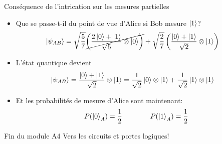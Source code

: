 \documentclass[aspectratio=169,12pt]{beamer}
\begin{document}
\begin{frame}{Conséquence de l'intrication sur les mesures partielles}
  \begin{itemize}[<+->]
    \item Que se passe-t-il du point de vue d'Alice si Bob mesure $\ket{1}$?
    \begin{align*}
      \ket{\psi_{AB}} 
      &= \sqrt{\frac{5}{7}} \cancel{\left( \frac{2\ket{0}+\ket{1}}{\sqrt{5}} \otimes \ket{0} \right)} + \sqrt{\frac{2}{7}} \left( \frac{\ket{0}+\ket{1}}{\sqrt{2}} \otimes \ket{1} \right)
    \end{align*}
    \item L'état quantique devient
    \begin{align*}
      \ket{\psi_{AB}} 
      &= \frac{\ket{0}+\ket{1}}{\sqrt{2}} \otimes \ket{1} = \frac{1}{\sqrt{2}} \ket{0} \otimes \ket{1} + \frac{1}{\sqrt{2}} \ket{1} \otimes \ket{1}
    \end{align*}
    \item Et les probabilités de mesure d'Alice sont maintenant:
    \begin{equation*}
      P(\ket{0}_A) = \frac{1}{2} \qquad\qquad P(\ket{1}_A) = \frac{1}{2}
    \end{equation*}
  \end{itemize}
\end{frame}

\begin{frame}{Fin du module A4}
    \centering
  \vfill
  Vers les circuits et portes logiques!
  \vfill
\end{frame}
\end{document}
